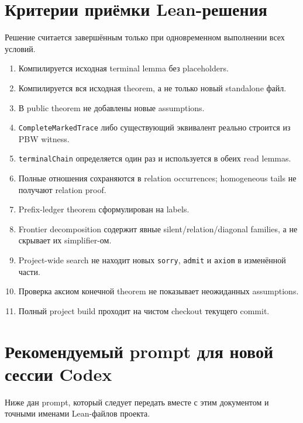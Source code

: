 \documentclass[11pt,a4paper]{article}
\theoremstyle{definition}
\theoremstyle{remark}
\begin{document}
\section{Критерии приёмки Lean-решения}

Решение считается завершённым только при одновременном выполнении всех
условий.

\begin{enumerate}
\item Компилируется исходная terminal lemma без placeholders.
\item Компилируется вся исходная theorem, а не только новый standalone файл.
\item В public theorem не добавлены новые assumptions.
\item \texttt{CompleteMarkedTrace} либо существующий эквивалент реально строится из
PBW witness.
\item \texttt{terminalChain} определяется один раз и используется в обеих read
lemmas.
\item Полные отношения сохраняются в relation occurrences; homogeneous tails
не получают relation proof.
\item Prefix-ledger theorem сформулирован на labels.
\item Frontier decomposition содержит явные silent/relation/diagonal
families, а не скрывает их simplifier-ом.
\item Project-wide search не находит новых \texttt{sorry}, \texttt{admit} и \texttt{axiom} в
изменённой части.
\item Проверка аксиом конечной theorem не показывает неожиданных assumptions.
\item Полный project build проходит на чистом checkout текущего commit.
\end{enumerate}

\section{Рекомендуемый prompt для новой сессии Codex}

Ниже дан prompt, который следует передать вместе с этим документом и точными
именами Lean-файлов проекта.
\end{document}
